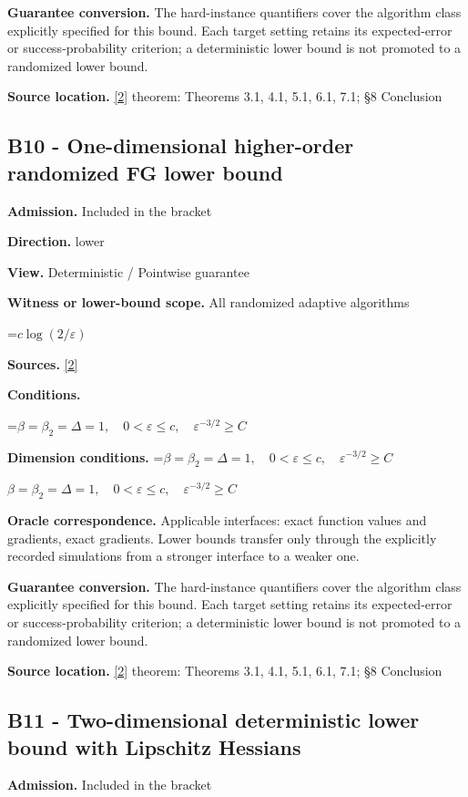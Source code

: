 \documentclass[10pt,a4paper]{article}
\newcommand{\AtlasMath}[1]{\par\begingroup\centering\setbox0=\hbox{$\displaystyle #1$}\ifdim\wd0>1.4\linewidth\typeout{ATLAS WIDE FORMULA: \the\wd0}\fi\ifdim\wd0>\linewidth\resizebox{\linewidth}{!}{\box0}\else\box0\fi\par\endgroup}
\newcommand{\AtlasInlineMath}[1]{\begingroup\setbox0=\hbox{$#1$}\ifdim\wd0>.4\linewidth\endgroup\AtlasMath{#1}\else\endgroup$#1$\fi}
\begin{document}
\textbf{Guarantee conversion.} The hard-instance quantifiers cover the algorithm class explicitly specified for this bound. Each target setting retains its expected-error or success-probability criterion; a deterministic lower bound is not promoted to a randomized lower bound.

\textbf{Source location.} \href{https://arxiv.org/abs/2610.16295}{[2]} theorem: Theorems 3.1, 4.1, 5.1, 6.1, 7.1; §8 Conclusion

\subsection{B10 - One-dimensional higher-order randomized FG lower bound}
\textbf{Admission.} Included in the bracket

\textbf{Direction.} lower

\textbf{View.} Deterministic / Pointwise guarantee

\textbf{Witness or lower-bound scope.} All randomized adaptive algorithms

\AtlasMath{c\log(2/\varepsilon)}
\textbf{Sources.} \href{https://arxiv.org/abs/2610.16295}{[2]}

\textbf{Conditions.} 
\AtlasMath{\beta=\beta_2=\Delta=1,\quad0<\varepsilon\le c,\quad\varepsilon^{-3/2}\ge C}


\textbf{Dimension conditions.} \AtlasInlineMath{\beta=\beta_2=\Delta=1,\quad0<\varepsilon\le c,\quad\varepsilon^{-3/2}\ge C}

\textbf{Oracle correspondence.} Applicable interfaces: exact function values and gradients, exact gradients. Lower bounds transfer only through the explicitly recorded simulations from a stronger interface to a weaker one.

\textbf{Guarantee conversion.} The hard-instance quantifiers cover the algorithm class explicitly specified for this bound. Each target setting retains its expected-error or success-probability criterion; a deterministic lower bound is not promoted to a randomized lower bound.

\textbf{Source location.} \href{https://arxiv.org/abs/2610.16295}{[2]} theorem: Theorems 3.1, 4.1, 5.1, 6.1, 7.1; §8 Conclusion

\subsection{B11 - Two-dimensional deterministic lower bound with Lipschitz Hessians}
\textbf{Admission.} Included in the bracket
\end{document}
